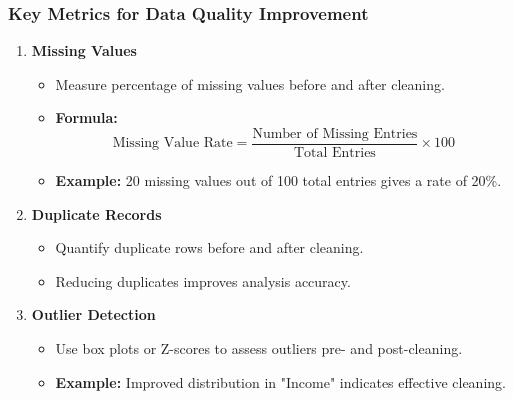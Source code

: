 \documentclass[aspectratio=169]{beamer}
\begin{document}
\begin{frame}[fragile]
    \frametitle{Key Metrics for Data Quality Improvement}
    \begin{enumerate}
        \item \textbf{Missing Values}
            \begin{itemize}
                \item Measure percentage of missing values before and after cleaning.
                \item \textbf{Formula:}
                \begin{equation}
                    \text{Missing Value Rate} = \frac{\text{Number of Missing Entries}}{\text{Total Entries}} \times 100
                \end{equation}
                \item \textbf{Example:} 20 missing values out of 100 total entries gives a rate of 20\%.
            \end{itemize}
        
        \item \textbf{Duplicate Records}
            \begin{itemize}
                \item Quantify duplicate rows before and after cleaning.
                \item Reducing duplicates improves analysis accuracy.
            \end{itemize}
        
        \item \textbf{Outlier Detection}
            \begin{itemize}
                \item Use box plots or Z-scores to assess outliers pre- and post-cleaning.
                \item \textbf{Example:} Improved distribution in "Income" indicates effective cleaning.
            \end{itemize}
    \end{enumerate}
\end{frame}
\end{document}
